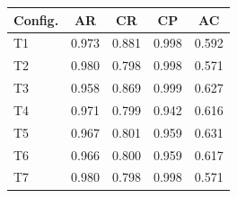 \begin{tabular}{lcccc}
\hline
\textbf{Config.} & \textbf{AR} & \textbf{CR} & \textbf{CP} & \textbf{AC} \\
\hline
T1 & 0.973 & 0.881 & 0.998 & 0.592 \\
T2 & 0.980 & 0.798 & 0.998 & 0.571 \\
T3 & 0.958 & 0.869 & 0.999 & 0.627 \\
T4 & 0.971 & 0.799 & 0.942 & 0.616 \\
T5 & 0.967 & 0.801 & 0.959 & 0.631 \\
T6 & 0.966 & 0.800 & 0.959 & 0.617 \\
T7 & 0.980 & 0.798 & 0.998 & 0.571 \\
\hline
\end{tabular}

